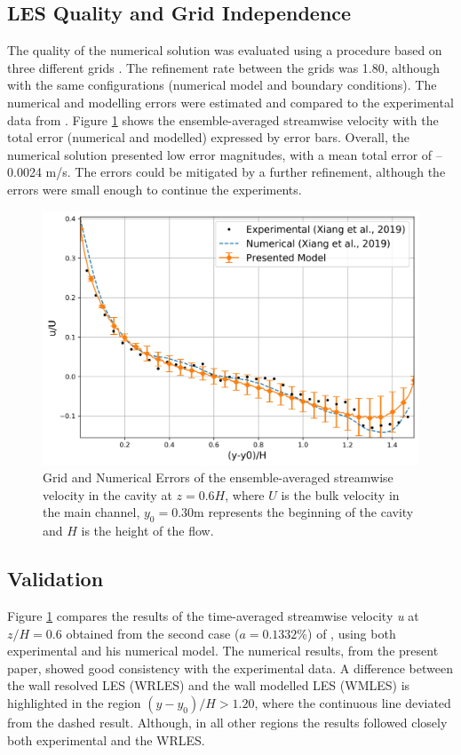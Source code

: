 \subsection{LES Quality and Grid Independence}
The quality of the numerical solution was evaluated using a procedure based on three different grids \cite{Dutta2018}. The refinement rate between the grids was 1.80, although with the same configurations (numerical model and boundary conditions). The numerical and modelling errors were estimated and compared to the experimental data from \textcite{xiang2019}. Figure \ref{fig:art4:validation} shows the ensemble-averaged streamwise velocity with the total error (numerical and modelled) expressed by error bars. Overall, the numerical solution presented low error magnitudes, with a mean total error of –0.0024 m/s. The errors could be mitigated by a further refinement, although the errors were small enough to continue the experiments.

\begin{figure}[!ht]
\centering
\includegraphics[width=\linewidth]{../images/art4/validation.jpeg}
\caption{Grid and Numerical Errors of the ensemble-averaged streamwise velocity in the cavity at $z=0.6H$, where $U$ is the bulk velocity in the main channel, $y_0=0.30$m represents the beginning of the cavity and $H$ is the height of the flow.}
\label{fig:art4:validation}
\end{figure}
\subsection{Validation}
Figure \ref{fig:art4:validation} compares the results of the time-averaged streamwise velocity \textit{u} at $z/H=0.6$ obtained from the second case ($a=0.1332$\%) of \textcite{xiang2019}, using both experimental and his numerical model. The numerical results, from the present paper, showed good consistency with the experimental data. A difference between the wall resolved LES (WRLES) and the wall modelled LES (WMLES) is highlighted in the region $(y-y_0)/H > 1.20$, where the continuous line deviated from the dashed result. Although, in all other regions the results followed closely both experimental and the WRLES.

